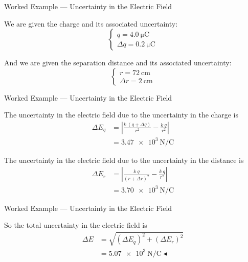 \documentclass{beamer}
\begin{document}
\begin{frame}{Worked Example --- Uncertainty in the Electric Field}

We are given the charge and its associated uncertainty:
\begin{equation*}
    \begin{cases} q = \SI{4.0}{\micro\coulomb} \\ \Delta q = \SI{0.2}{\micro\coulomb} \end{cases}
\end{equation*}

And we are given the separation distance and its associated uncertainty:
\begin{equation*}
    \begin{cases} r = \SI{72}{\centi\metre} \\ \Delta r = \SI{2}{\centi\metre} \end{cases}
\end{equation*}

\end{frame}

\begin{frame}{Worked Example --- Uncertainty in the Electric Field}

The uncertainty in the electric field due to the uncertainty in the charge is
\begin{align*}
    \Delta E_q &= \left| \frac{k\ \left(q + \Delta q \right)}{r^2} - \frac{k\ q}{r^2} \right| \\
               &= \SI{3.47e3}{\newton/\coulomb}
\end{align*}

The uncertainty in the electric field due to the uncertainty in the distance is
\begin{align*}
    \Delta E_r &= \left| \frac{k\ q}{\left(r + \Delta r\right)^2} - \frac{k\ q}{r^2} \right| \\
               &= \SI{3.70e3}{\newton/\coulomb}
\end{align*}

\end{frame}

\begin{frame}{Worked Example --- Uncertainty in the Electric Field} 

So the total uncertainty in the electric field is
\begin{align*}
    \Delta E &= \sqrt{\left(\Delta E_q\right)^2 + \left(\Delta E_r\right)^2} \\
             &= \boxed{\SI{5.07e3}{\newton/\coulomb}} \blacktriangleleft
\end{align*}

\end{frame}
\end{document}
